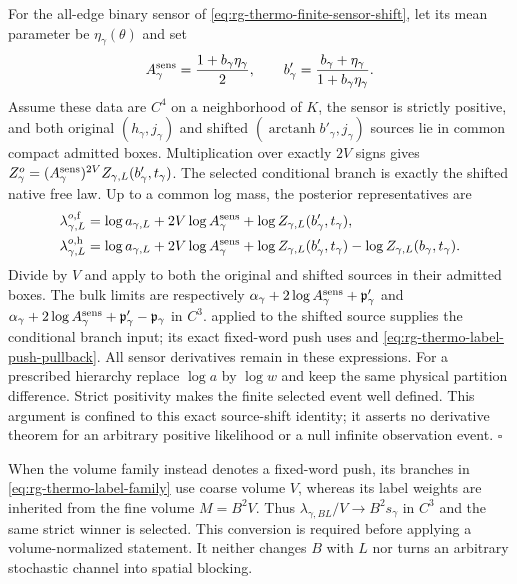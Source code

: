 For the all-edge binary sensor of
\cref{eq:rg-thermo-finite-sensor-shift}, let its mean parameter be
$\eta_\gamma(\theta)$ and set
\begin{equation}
 A_\gamma^{\rm sens}=\frac{1+b_\gamma\eta_\gamma}{2},\qquad
 b'_\gamma=\frac{b_\gamma+\eta_\gamma}{1+b_\gamma\eta_\gamma}.
 \label{eq:rg-thermo-label-sensor-data}
\end{equation}
Assume these data are $C^4$ on a neighborhood of $K$, the sensor is
strictly positive, and both original $(h_\gamma,j_\gamma)$ and shifted
$(\operatorname{arctanh}b'_\gamma,j_\gamma)$ sources lie in common
compact admitted boxes. Multiplication over exactly $2V$ signs gives
$Z_\gamma^o=(A_\gamma^{\rm sens})^{2V}Z_{\gamma,L}(b'_\gamma,t_\gamma)$.
The selected conditional branch is exactly the shifted native free law.
Up to a common log mass, the posterior representatives are
\begin{align}
 \lambda_{\gamma,L}^{o,\rm f}
 &=\log a_{\gamma,L}+2V\log A_\gamma^{\rm sens}
                 +\log Z_{\gamma,L}(b'_\gamma,t_\gamma),
 \label{eq:rg-thermo-label-posterior-factor}\\
 \lambda_{\gamma,L}^{o,\rm h}
 &=\log a_{\gamma,L}+2V\log A_\gamma^{\rm sens}
       +\log Z_{\gamma,L}(b'_\gamma,t_\gamma)
       -\log Z_{\gamma,L}(b_\gamma,t_\gamma).
 \label{eq:rg-thermo-label-posterior-hierarchy}
\end{align}
Divide by $V$ and apply  to
both the original and shifted sources in their admitted boxes. The
bulk limits are respectively
$\alpha_\gamma+2\log A_\gamma^{\rm sens}+\mathfrak p'_\gamma$ and
$\alpha_\gamma+2\log A_\gamma^{\rm sens}
 +\mathfrak p'_\gamma-\mathfrak p_\gamma$ in $C^3$.
 applied to the shifted source
supplies the conditional branch input; its exact fixed-word push uses
 and
\cref{eq:rg-thermo-label-push-pullback}. All sensor derivatives remain
in these expressions. For a prescribed
hierarchy replace $\log a$ by $\log w$ and keep the same physical
partition difference. Strict positivity makes the finite selected event
well defined. This argument is confined to this exact source-shift
identity; it asserts no derivative theorem for an arbitrary positive
likelihood or a null infinite observation event. $\square$

When the volume family instead denotes a fixed-word push, its branches
in \cref{eq:rg-thermo-label-family} use coarse volume $V$, whereas its
label weights are inherited from the fine volume $M=B^2V$. Thus
$\lambda_{\gamma,BL}/V\to B^2s_\gamma$ in $C^3$ and the same strict
winner is selected. This conversion is required before applying a
volume-normalized statement. It neither changes $B$ with $L$ nor turns
an arbitrary stochastic channel into spatial blocking.

